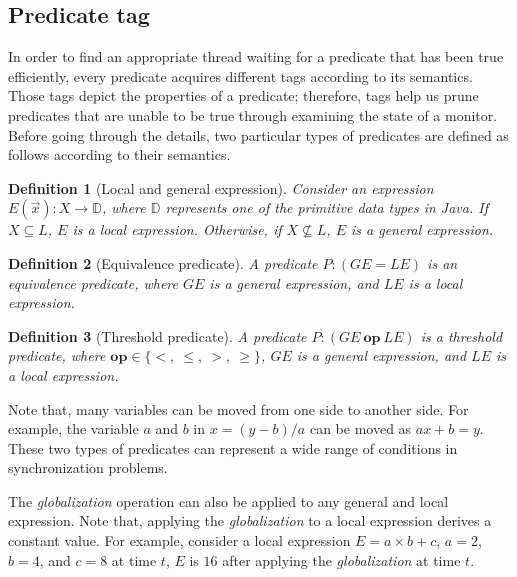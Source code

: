 \documentclass[preprint]{sigplanconf}
\newtheorem{definition}{Definition}
\begin{document}
\subsection{Predicate tag} \label{sec:tag}
In order to find an appropriate thread waiting for a predicate that has been
true efficiently, every predicate acquires different tags according to its 
semantics. Those tags depict the properties of a predicate; therefore, tags
help us prune predicates that are unable to be true through examining the state 
of a monitor. Before going through the details, two particular types of 
predicates are defined as follows according to their semantics. 
\begin{definition}[Local and general expression]
    Consider an expression $E(\vec{x}): X \rightarrow \mathbb{D}$, where
    $\mathbb{D}$ represents one of the primitive data types in Java. If $X
    \subseteq L$, $E$ is a local expression. Otherwise, if $X \not\subseteq L$,
    $E$ is a general expression.  
\end{definition}

\begin{definition}[Equivalence predicate]
    A predicate $P: (GE = LE)$ is an equivalence predicate, where $GE$ is a
    general expression, and $LE$ is a local expression.
\end{definition}
\begin{definition}[Threshold predicate]
   A predicate $P: (GE\ \boldsymbol{op}\ LE)$ is a threshold predicate, where 
   $\boldsymbol{op}
    \in \{<,\ \le,\ >,\ \ge\}$, $GE$ is a general expression, and $LE$ is a
    local expression.
\end{definition}
Note that, many variables can be moved from one side to another side. For
example, the variable $a$ and $b$ in $x = (y - b) / a$ can be moved as 
$ax + b = y$. These two types of predicates can represent a wide range of
conditions in synchronization problems. 

The {\em globalization} operation can also be applied to any general and local 
expression. Note that, applying the {\em globalization} to a local expression
derives a constant value. For example, consider a local expression 
$E = a \times b + c$, $a = 2$, $b = 4$, and $c = 8$ at time $t$, $E$ is $16$
after applying the {\em globalization} at time $t$. 
\end{document}

